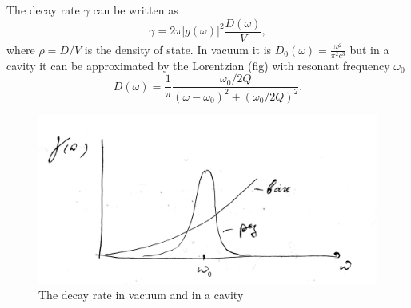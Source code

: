 The decay rate $\gamma$ can be written as
\begin{equation}
	\gamma = 2 \pi \left| g(\omega) \right|^2 \frac{D(\omega)}{V},
	\label{eq:gamma}
\end{equation}
where $\rho = D/V$ is the density of state. In vacuum it is $D_0(\omega) = \frac{\omega^2}{\pi^2 c^3}$ but in a cavity it can be approximated by the Lorentzian (fig) with resonant frequency $\omega_0$
\begin{equation}
	D(\omega) = \frac{1}{\pi} \frac{\omega_{0}/2Q}{(\omega - \omega_{0})^2 + \left( \omega_{0}/2Q \right)^2}.
\end{equation}

\begin{figure}
	\centering
	\includegraphics[width=0.5\linewidth]{fig/L10/gamma}
	\caption{The decay rate in vacuum and in a cavity}
	\label{fig:gamma}
\end{figure}

